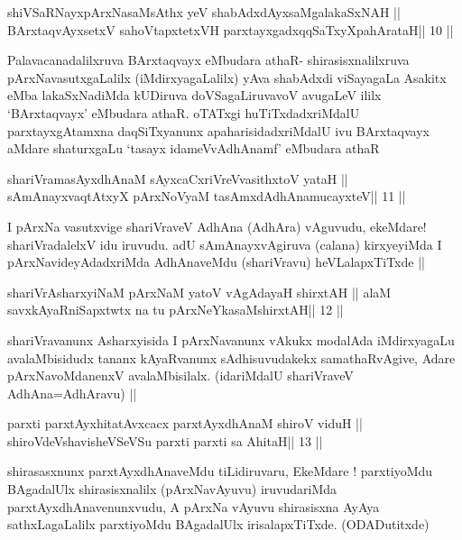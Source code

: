 \begin{shl}
shiVSaRNayxpArxNasaMsAthx yeV shabAdxdAyxsaMgalakaSxNAH ||
BArxtaqvAyxsetxV sahoVtapxtetxVH parxtayxgadxqqSaTxyXpahArataH\hfill || 10 ||
\end{shl}

\begin{artha}
Palavacanadalilxruva BArxtaqvayx eMbudara athaR- shirasisxnalilxruva
pArxNavasutxgaLalilx (iMdirxyagaLalilx) yAva shabAdxdi viSayagaLa
Asakitx eMba lakaSxNadiMda kUDiruva doVSagaLiruvavoV avugaLeV ililx
`BArxtaqvayx' eMbudara athaR. oTATxgi huTiTxdadxriMdalU
parxtayxgAtamxna daqSiTxyanunx apaharisidadxriMdalU ivu BArxtaqvayx
aMdare shaturxgaLu `tasayx idameVvA\s\s dhAnamf' eMbudara athaR
\end{artha}

\begin{shl}
shariVramasAyx\s\s dhAnaM sAyxcaCxriVreV\s vasithxtoV yataH ||
sAmAnayxvaqtAtxyX pArxNoV\s yaM tasAmxdAdhAnamucayxteV\hfill || 11 ||
\end{shl}

\begin{artha}
I pArxNa vasutxvige shariVraveV AdhAna (AdhAra) vAguvudu, ekeMdare!
shariVradalelxV idu iruvudu. adU sAmAnayxvAgiruva (calana) kirxyeyiMda I
pArxNavideyAdadxriMda AdhAnaveMdu (shariVravu) heVLalapxTiTxde ||
\end{artha}

\begin{shl}
shariVrAsharxyiNaM pArxNaM yatoV vAgAdayaH shirxtAH ||
alaM savxkAyaRniSapxtwtx na tu pArxNeYkasaMshirxtAH\hfill || 12 ||
\end{shl}

\begin{artha}
shariVravanunx Asharxyisida I pArxNavanunx vAkukx modalAda
iMdirxyagaLu avalaMbisidudx tananx kAyaRvanunx sAdhisuvudakekx
samathaRvAgive, Adare pArxNavoMdanenxV avalaMbisilalx. (idariMdalU
shariVraveV AdhAna=AdhAravu) ||
\end{artha}



\begin{shl}
parxti parxtAyxhitatAvxcacx parxtAyxdhAnaM shiroV viduH ||
shiroVdeVshavisheVSeVSu parxti parxti sa AhitaH\hfill || 13 ||
\end{shl}

\begin{artha}
shirasasxnunx parxtAyxdhAnaveMdu tiLidiruvaru, EkeMdare ! parxtiyoMdu
BAgadalUlx shirasisxnalilx (pArxNavAyuvu) iruvudariMda
parxtAyxdhAnavenunxvudu, A pArxNa vAyuvu shirasisxna AyAya
sathxLagaLalilx parxtiyoMdu BAgadalUlx irisalapxTiTxde. (ODADutitxde)
\end{artha}


